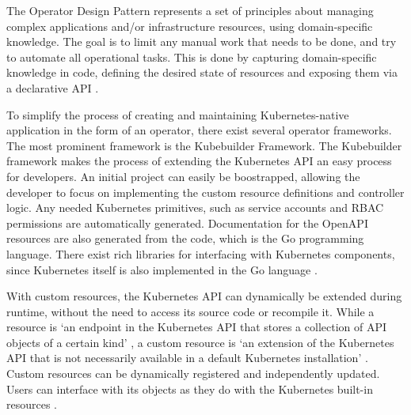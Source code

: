 
The Operator Design Pattern represents a set of principles about
managing complex applications and/or infrastructure resources,
using domain-specific knowledge.
The goal is to limit any manual work that needs to be done,
and try to automate all operational tasks.
This is done by capturing domain-specific knowledge in code,
defining the desired state of resources and exposing them
via a declarative API
\autocite{operatorWhitepaperV1}.

To simplify the process of creating and maintaining Kubernetes-native application
in the form of an operator,
there exist several operator frameworks.
The most prominent framework is the Kubebuilder Framework.
The Kubebuilder framework makes the process of extending the Kubernetes API
an easy process for developers.
An initial project can easily be boostrapped, allowing the developer to focus
on implementing the custom resource definitions and controller logic.
Any needed Kubernetes primitives, such as service accounts and RBAC permissions
are automatically generated.
Documentation for the OpenAPI resources are also generated from the code,
which is the Go programming language.
There exist rich libraries for interfacing with Kubernetes components,
since Kubernetes itself is also implemented in the Go language
\autocite{kubebuilderBookWebsite}.

With custom resources, the Kubernetes API can dynamically be extended during runtime,
without the need to access its source code or recompile it.
While a resource is
\enquote*{an endpoint in the Kubernetes API that stores a collection of API objects of a certain kind}
\autocite{customResourcesKubernetesIO},
a custom resource is
\enquote*{an extension of the Kubernetes API that is not necessarily available in a default Kubernetes installation}
\autocite{customResourcesKubernetesIO}.
Custom resources can be dynamically registered and independently updated.
Users can interface with its objects as they do with the Kubernetes built-in resources
\autocite{customResourcesKubernetesIO}.















